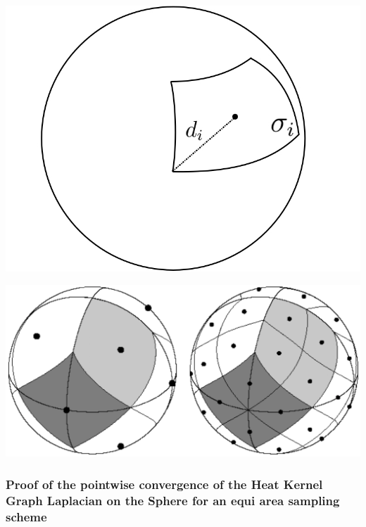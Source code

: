 \vspace{1cm}
\begin{minipage}{.4\textwidth}
	\centering
	\includegraphics[width=0.8\linewidth]{figs/chapter1/d_iA_i.jpg}
\end{minipage}%
\hfill
\begin{minipage}{.5\textwidth}
	\centering
	\includegraphics[width=\linewidth]{figs/chapter1/Heal_Base.png}
	\vspace{0.5cm}
\end{minipage}

\subsubsection{Proof of the pointwise convergence of the Heat Kernel Graph Laplacian on the Sphere for an equi area sampling scheme}

